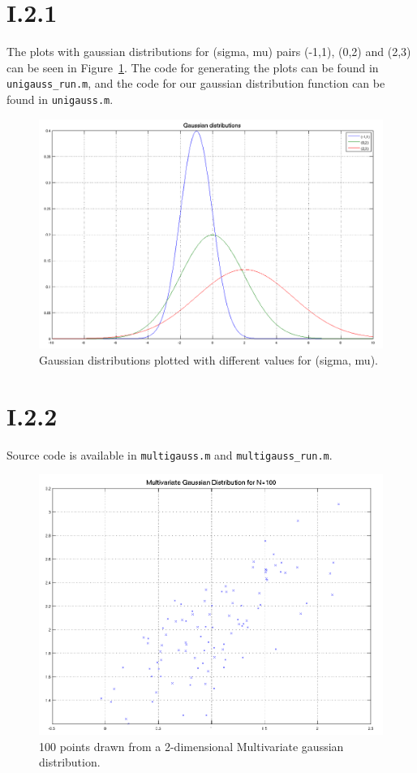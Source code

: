 \section*{I.2.1}
The plots with gaussian distributions for (sigma, mu) pairs (-1,1), (0,2) and (2,3) can be
seen in Figure~\ref{fig:I.2.1}. The code for generating the plots can be found in \texttt{unigauss\_run.m}, 
and the code for our gaussian distribution function can be found in \texttt{unigauss.m}.

\begin{figure}[h!]
	\includegraphics[width=\textwidth]{img/unigauss}
	\caption{Gaussian distributions plotted with different values for (sigma, mu). \label{fig:I.2.1}}
\end{figure}

\section*{I.2.2}
Source code is available in \texttt{multigauss.m} and \texttt{multigauss\_run.m}.

\begin{figure}[h!]
	\includegraphics[width=\textwidth]{img/multigauss}
	\caption{100 points drawn from a 2-dimensional Multivariate gaussian distribution. \label{fig:I.2.2}}
\end{figure}

